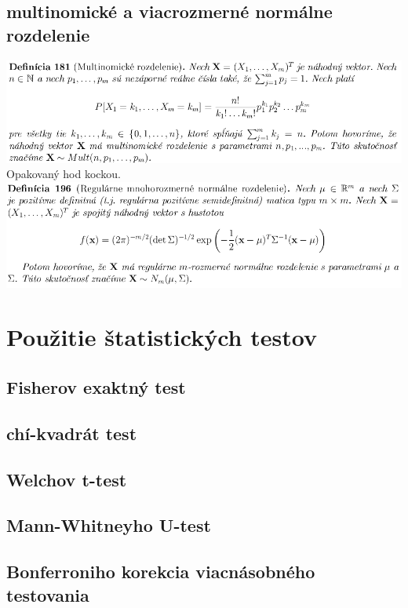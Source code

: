 \subsection {multinomické a viacrozmerné normálne rozdelenie}
\includegraphics[width=1\textwidth]{images/pravdepodobnost/multinom_rozd}\\
Opakovaný hod kockou.\\
\includegraphics[width=1\textwidth]{images/pravdepodobnost/viacrozm_norm_rozd}\\

\section{Použitie štatistických testov}

\subsection {Fisherov exaktný test}
\subsection {chí-kvadrát test}
\subsection {Welchov t-test}
\subsection {Mann-Whitneyho U-test}
\subsection {Bonferroniho korekcia viacnásobného testovania}
